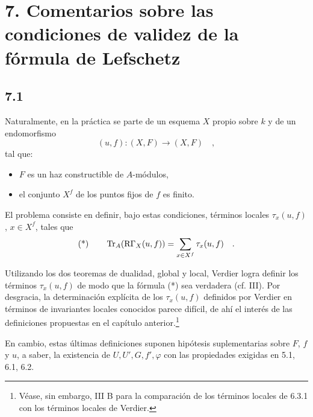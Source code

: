 \section*{7. Comentarios sobre las condiciones de validez de la fórmula de Lefschetz}

\subsection*{7.1}
Naturalmente, en la práctica se parte de un esquema $X$ propio sobre $k$ y de un endomorfismo
\[
(u, f) : (X, F) \longrightarrow (X, F) \quad ,
\]
tal que:
\begin{itemize}
\item $F$ es un haz constructible de $A$-módulos,
\item el conjunto $X^f$ de los puntos fijos de $f$ es finito.
\end{itemize}

El problema consiste en definir, bajo estas condiciones, términos locales $\tau_x(u, f)$, $x \in X^f$, tales que
\[
\text{(*)} \qquad \operatorname{Tr}_A(\mathrm{R}\Gamma_X(u, f)) = \sum_{x \in X^f} \tau_x(u, f) \quad .
\]

Utilizando los dos teoremas de dualidad, global y local, Verdier logra definir los términos $\tau_x(u, f)$ de modo que la fórmula (*) sea verdadera (cf. III). Por desgracia, la determinación explícita de los $\tau_x(u, f)$ definidos por Verdier en términos de invariantes locales conocidos parece difícil, de ahí el interés de las definiciones propuestas en el capítulo anterior.\footnote{Véase, sin embargo, III B para la comparación de los términos locales de 6.3.1 con los términos locales de Verdier.}

En cambio, estas últimas definiciones suponen hipótesis suplementarias sobre $F$, $f$ y $u$, a saber, la existencia de $U, U', G, f', \varphi$ con las propiedades exigidas en 5.1, 6.1, 6.2.
